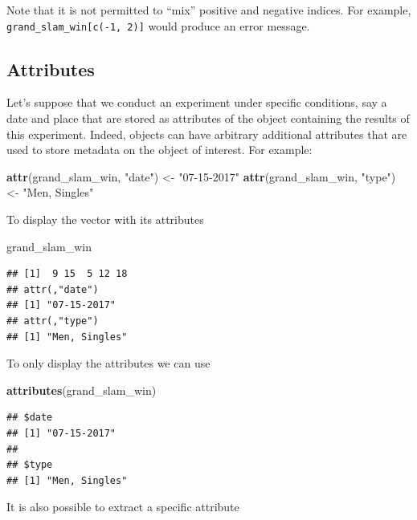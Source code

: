 \documentclass[12pt,]{krantz}
\newenvironment{Shaded}{\begin{snugshade}}{\end{snugshade}}
\newcommand{\KeywordTok}[1]{\textcolor[rgb]{0.27,0.27,0.27}{\textbf{#1}}}
\newcommand{\StringTok}[1]{\textcolor[rgb]{0.5,0.5,0.5}{#1}}
\newcommand{\NormalTok}[1]{#1}
\let\BeginKnitrBlock\begin \let\EndKnitrBlock\end
\begin{document}
\BeginKnitrBlock{rmdcaution}
Note that it is not permitted to ``mix'' positive and negative indices.
For example, \texttt{grand\_slam\_win{[}c(-1,\ 2){]}} would produce an
error message.
\EndKnitrBlock{rmdcaution}

\subsection{Attributes}\label{vectattr}

Let's suppose that we conduct an experiment under specific conditions,
say a date and place that are stored as attributes of the object
containing the results of this experiment. Indeed, objects can have
arbitrary additional attributes that are used to store metadata on the
object of interest. For example:

\begin{Shaded}
\begin{Highlighting}[]
\KeywordTok{attr}\NormalTok{(grand_slam_win, }\StringTok{"date"}\NormalTok{) <-}\StringTok{ "07-15-2017"}
\KeywordTok{attr}\NormalTok{(grand_slam_win, }\StringTok{"type"}\NormalTok{) <-}\StringTok{ "Men, Singles"}
\end{Highlighting}
\end{Shaded}

To display the vector with its attributes

\begin{Shaded}
\begin{Highlighting}[]
\NormalTok{grand_slam_win}
\end{Highlighting}
\end{Shaded}

\begin{verbatim}
## [1]  9 15  5 12 18
## attr(,"date")
## [1] "07-15-2017"
## attr(,"type")
## [1] "Men, Singles"
\end{verbatim}

To only display the attributes we can use

\begin{Shaded}
\begin{Highlighting}[]
\KeywordTok{attributes}\NormalTok{(grand_slam_win)}
\end{Highlighting}
\end{Shaded}

\begin{verbatim}
## $date
## [1] "07-15-2017"
## 
## $type
## [1] "Men, Singles"
\end{verbatim}

It is also possible to extract a specific attribute
\end{document}
